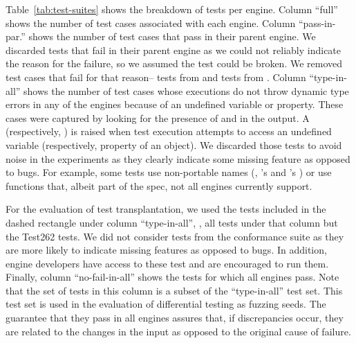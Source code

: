 \documentclass[smallextended]{svjour3}
\begin{document}
Table~\ref{tab:test-suites} shows the breakdown of tests per
engine. Column ``full'' shows the number of test cases associated with
each engine. Column ``pass-in-par.''  shows the number of test cases
that pass in their parent engine. We discarded tests that fail in
their parent engine as we could not reliably indicate the reason for
the failure, so we assumed the test could be broken. We removed \testsThatFail{}
test cases that fail for that reason--\testsThatFailJSC{} tests from \jsc and
\testsThatFailSM{} tests from \smonkey. Column ``type-in-all''
shows the number of test cases whose executions do not throw
dynamic type errors in any of the engines because of an undefined variable or property.
These cases were captured by looking for the presence of  and
 in the output. A 
(respectively, ) is raised when test execution
attempts to access an undefined variable (respectively, property of an
object). We discarded those tests to avoid noise in the experiments as
they clearly indicate some missing feature as opposed to bugs. For
example, some tests use non-portable names (\eg{}, \jsc's
 and \smonkey{}'s )
or use functions that, albeit part of the spec, not all engines
currently support. 

For the evaluation of test transplantation, we used
the \totalTestFilesForTestTransplantation{} tests included in the
dashed rectangle under column ``type-in-all'', \ie{}, all tests under
that column but the Test262 tests. We did not consider tests from the
conformance suite as they are more likely to indicate missing features
as opposed to bugs. In addition, engine developers have access to
these test and are encouraged to run them. Finally, column
``no-fail-in-all'' shows the tests for which all engines pass. Note
that the set of tests in this column is a subset of the
``type-in-all'' test set. This test set is used in the evaluation of
differential testing as fuzzing seeds. The guarantee that they pass in
all engines assures that, if discrepancies occur, they are related to
the changes in the input as opposed to the original cause of failure.
\end{document}
